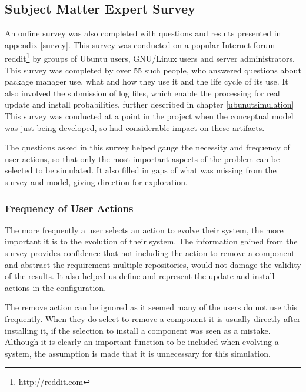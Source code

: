 \subsection{Subject Matter Expert Survey}
\label{usersurvey}
An online survey was also completed with questions and results presented in appendix \ref{survey}.
This survey was conducted on a popular Internet forum reddit\footnote{http://reddit.com} by groups of Ubuntu users, GNU/Linux users and server administrators.
This survey was completed by over 55 such people, who answered questions about package manager use, what and how they use it and the life cycle of its use.
It also involved the submission of log files, which enable the processing for real update and install probabilities, further described in chapter \ref{ubunutsimulation}
This survey was conducted at a point in the project when the conceptual model was just being developed, so had considerable impact on these artifacts.

The questions asked in this survey helped gauge the necessity and frequency of user actions,
so that only the most important aspects of the problem can be selected to be simulated.
It also filled in gaps of what was missing from the survey and model, giving direction for exploration.

\subsubsection{Frequency of User Actions}
The more frequently a user selects an action to evolve their system, the more important it is to the evolution of their system.
The information gained from the survey provides confidence that not including the action to remove a component and abstract the requirement multiple repositories, 
would not damage the validity of the results.
It also helped us define and represent the update and install actions in the configuration.

The remove action can be ignored as it seemed many of the users do not use this frequently.
When they do select to remove a component it is usually directly after installing it, if the selection to install a component was seen as a mistake.
Although it is clearly an important function to be included when evolving a system, the assumption is made that it is unnecessary for this simulation.

